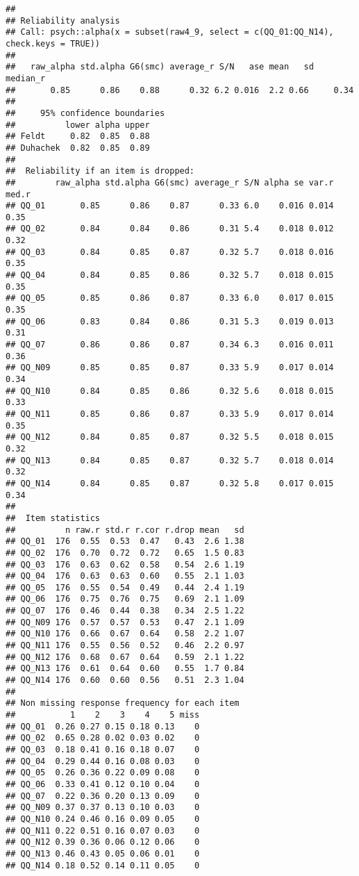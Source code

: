 \documentclass[
]{article}
\begin{document}
\begin{verbatim}
## 
## Reliability analysis   
## Call: psych::alpha(x = subset(raw4_9, select = c(QQ_01:QQ_N14), check.keys = TRUE))
## 
##   raw_alpha std.alpha G6(smc) average_r S/N   ase mean   sd median_r
##       0.85      0.86    0.88      0.32 6.2 0.016  2.2 0.66     0.34
## 
##     95% confidence boundaries 
##          lower alpha upper
## Feldt     0.82  0.85  0.88
## Duhachek  0.82  0.85  0.89
## 
##  Reliability if an item is dropped:
##        raw_alpha std.alpha G6(smc) average_r S/N alpha se var.r med.r
## QQ_01       0.85      0.86    0.87      0.33 6.0    0.016 0.014  0.35
## QQ_02       0.84      0.84    0.86      0.31 5.4    0.018 0.012  0.32
## QQ_03       0.84      0.85    0.87      0.32 5.7    0.018 0.016  0.35
## QQ_04       0.84      0.85    0.86      0.32 5.7    0.018 0.015  0.35
## QQ_05       0.85      0.86    0.87      0.33 6.0    0.017 0.015  0.35
## QQ_06       0.83      0.84    0.86      0.31 5.3    0.019 0.013  0.31
## QQ_07       0.86      0.86    0.87      0.34 6.3    0.016 0.011  0.36
## QQ_N09      0.85      0.85    0.87      0.33 5.9    0.017 0.014  0.34
## QQ_N10      0.84      0.85    0.86      0.32 5.6    0.018 0.015  0.33
## QQ_N11      0.85      0.86    0.87      0.33 5.9    0.017 0.014  0.35
## QQ_N12      0.84      0.85    0.87      0.32 5.5    0.018 0.015  0.32
## QQ_N13      0.84      0.85    0.87      0.32 5.7    0.018 0.014  0.32
## QQ_N14      0.84      0.85    0.87      0.32 5.8    0.017 0.015  0.34
## 
##  Item statistics 
##          n raw.r std.r r.cor r.drop mean   sd
## QQ_01  176  0.55  0.53  0.47   0.43  2.6 1.38
## QQ_02  176  0.70  0.72  0.72   0.65  1.5 0.83
## QQ_03  176  0.63  0.62  0.58   0.54  2.6 1.19
## QQ_04  176  0.63  0.63  0.60   0.55  2.1 1.03
## QQ_05  176  0.55  0.54  0.49   0.44  2.4 1.19
## QQ_06  176  0.75  0.76  0.75   0.69  2.1 1.09
## QQ_07  176  0.46  0.44  0.38   0.34  2.5 1.22
## QQ_N09 176  0.57  0.57  0.53   0.47  2.1 1.09
## QQ_N10 176  0.66  0.67  0.64   0.58  2.2 1.07
## QQ_N11 176  0.55  0.56  0.52   0.46  2.2 0.97
## QQ_N12 176  0.68  0.67  0.64   0.59  2.1 1.22
## QQ_N13 176  0.61  0.64  0.60   0.55  1.7 0.84
## QQ_N14 176  0.60  0.60  0.56   0.51  2.3 1.04
## 
## Non missing response frequency for each item
##           1    2    3    4    5 miss
## QQ_01  0.26 0.27 0.15 0.18 0.13    0
## QQ_02  0.65 0.28 0.02 0.03 0.02    0
## QQ_03  0.18 0.41 0.16 0.18 0.07    0
## QQ_04  0.29 0.44 0.16 0.08 0.03    0
## QQ_05  0.26 0.36 0.22 0.09 0.08    0
## QQ_06  0.33 0.41 0.12 0.10 0.04    0
## QQ_07  0.22 0.36 0.20 0.13 0.09    0
## QQ_N09 0.37 0.37 0.13 0.10 0.03    0
## QQ_N10 0.24 0.46 0.16 0.09 0.05    0
## QQ_N11 0.22 0.51 0.16 0.07 0.03    0
## QQ_N12 0.39 0.36 0.06 0.12 0.06    0
## QQ_N13 0.46 0.43 0.05 0.06 0.01    0
## QQ_N14 0.18 0.52 0.14 0.11 0.05    0
\end{verbatim}
\end{document}
